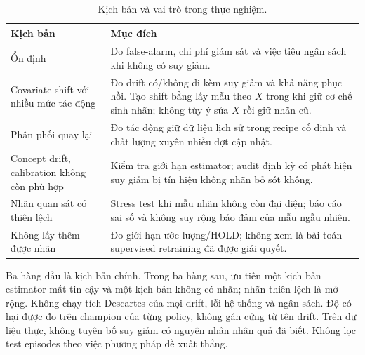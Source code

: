 \begin{table}[ht]
\centering
\caption{Kịch bản và vai trò trong thực nghiệm.}\label{tab:scenarios}
\begin{tabularx}{\linewidth}{@{}L{3.8cm} Y@{}}
\toprule\textbf{Kịch bản} & \textbf{Mục đích} \\
\midrule
Ổn định & Đo false-alarm, chi phí giám sát và việc tiêu ngân sách khi không có suy giảm. \\
Covariate shift với nhiều mức tác động & Đo drift có/không đi kèm suy giảm và khả năng phục hồi. Tạo shift bằng lấy mẫu theo $X$ trong khi giữ cơ chế sinh nhãn; không tùy ý sửa $X$ rồi giữ nhãn cũ. \\
Phân phối quay lại & Đo tác động giữ dữ liệu lịch sử trong recipe cố định và chất lượng xuyên nhiều đợt cập nhật. \\
Concept drift, calibration không còn phù hợp & Kiểm tra giới hạn estimator; audit định kỳ có phát hiện suy giảm bị tín hiệu không nhãn bỏ sót không. \\
Nhãn quan sát có thiên lệch & Stress test khi mẫu nhãn không còn đại diện; báo cáo sai số và không suy rộng bảo đảm của mẫu ngẫu nhiên. \\
Không lấy thêm được nhãn & Đo giới hạn ước lượng/HOLD; không xem là bài toán supervised retraining đã được giải quyết. \\
\bottomrule
\end{tabularx}
\end{table}
Ba hàng đầu là kịch bản chính. Trong ba hàng sau, ưu tiên một kịch bản estimator mất tin cậy và một kịch bản không có nhãn; nhãn thiên lệch là mở rộng. Không chạy tích Descartes của mọi drift, lỗi hệ thống và ngân sách. Độ có hại được đo trên champion của từng policy, không gán cứng từ tên drift. Trên dữ liệu thực, không tuyên bố suy giảm có nguyên nhân nhân quả đã biết. Không lọc test episodes theo việc phương pháp đề xuất thắng.

